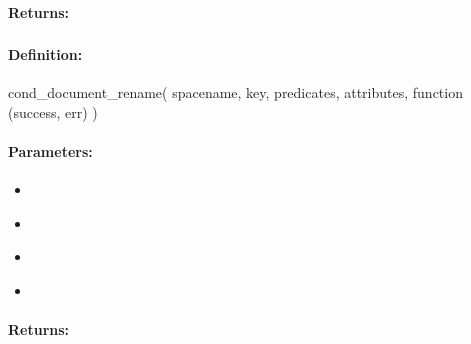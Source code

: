 \paragraph{Returns:}


\pagebreak
\subsubsection{}
\label{api:nodejs:cond_document_rename}


\paragraph{Definition:}
\begin{javascriptcode}
cond_document_rename(
        spacename, key, predicates, attributes, function (success, err) {})
\end{javascriptcode}
\paragraph{Parameters:}
\begin{itemize}[noitemsep]
\item {}\\

\item {}\\

\item {}\\

\item {}\\

\end{itemize}

\paragraph{Returns:}


\pagebreak
\subsubsection{}
\label{api:nodejs:group_document_rename}


